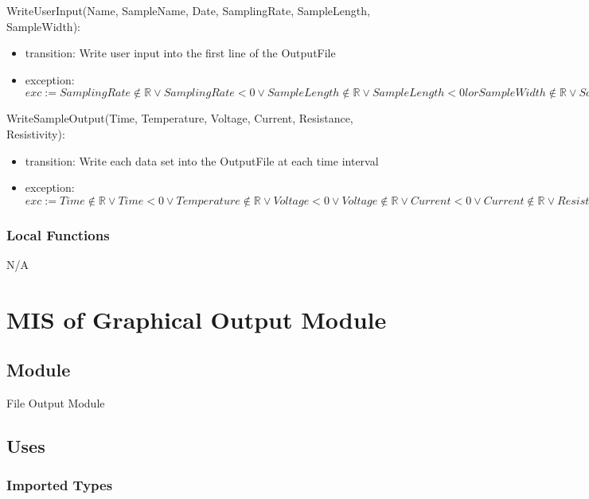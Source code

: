 \documentclass[12pt, titlepage]{article}
\begin{document}
\noindent WriteUserInput(Name, SampleName, Date, SamplingRate, SampleLength, SampleWidth):
\begin{itemize}
\item transition: Write user input into the first line of the OutputFile 
\item exception: $exc:= SamplingRate \notin \mathbb{R} \lor SamplingRate < 0 \lor SampleLength \notin \mathbb{R} \lor SampleLength < 0 lor SampleWidth \notin \mathbb{R} \lor SampleWidth < 0 \Rightarrow INVALID$
\end{itemize}

\noindent WriteSampleOutput(Time, Temperature, Voltage, Current, Resistance, Resistivity):
\begin{itemize}
\item transition: Write each data set into the OutputFile at each time interval
\item exception: $exc:= Time \notin  \mathbb{R} \lor Time < 0 \lor  Temperature \notin  \mathbb{R} \lor Voltage < 0 \lor  Voltage \notin  \mathbb{R} \lor Current < 0 \lor  Current \notin  \mathbb{R} \lor Resistance < 0 \lor  Resistance \notin  \mathbb{R} \lor Resistivity < 0\lor  Resistance \notin  \mathbb{R} \lor Resistivity < 0\Rightarrow INVALID$
\end{itemize}

\subsubsection{Local Functions}

N/A

\newpage

\section{MIS of Graphical Output Module} \label{GO} 

\subsection{Module}

File Output Module

\subsection{Uses}

\subsubsection{Imported Types}
\end{document}
